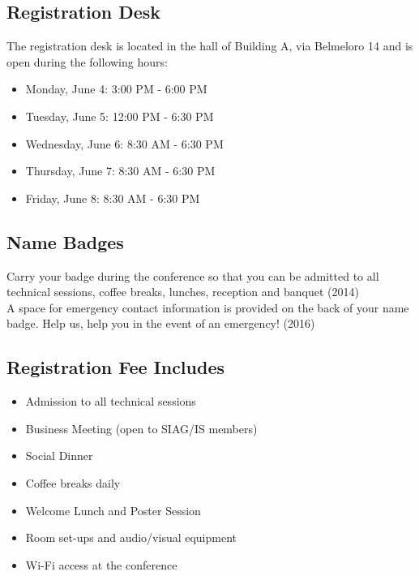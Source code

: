 \begin{multicols}{2}
\section*{Registration Desk}
The registration desk is located in the hall of Building A, via Belmeloro 14 and is open during the following hours:
\begin{itemize}
\item Monday, June 4: 3:00 PM - 6:00 PM
\item Tuesday, June 5: 12:00 PM - 6:30 PM
\item Wednesday, June 6: 8:30 AM - 6:30 PM
\item Thursday, June 7: 8:30 AM - 6:30 PM
\item Friday, June 8: 8:30 AM - 6:30 PM
\end{itemize}
\subsection*{Name Badges} Carry your badge during the conference so that you can be admitted to all technical sessions, coffee breaks, lunches, reception and banquet (2014)\\
A space for emergency contact information is provided on the back of your name badge. Help us, help you in the event of an emergency! (2016)
\subsection*{Registration Fee Includes}
\begin{itemize}
\item Admission to all technical sessions
\item Business Meeting (open to SIAG/IS members)
\item Social Dinner
\item Coffee breaks daily
\item Welcome Lunch and Poster Session
\item Room set-ups and audio/visual equipment
\item Wi-Fi access at the conference
\end{itemize}%

\end{multicols}
